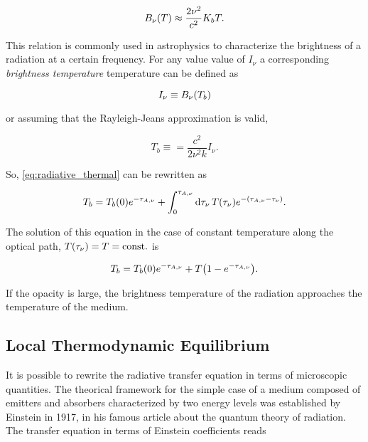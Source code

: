 \begin{equation}
        B_\nu\qty(T) \approx \frac{2\nu^2}{c^2} K_b T.
\end{equation}

This relation is commonly used in astrophysics to characterize the
brightness of a radiation at a certain frequency. For any value value of
$I_\nu$ a corresponding \emph{brightness temperature} temperature can be
defined as

\begin{equation}
        I_\nu \equiv B_\nu\qty(T_b)
\end{equation}

or assuming that the Rayleigh-Jeans approximation is valid,

\begin{equation}
        T_b \equiv = \frac{c^2}{2\nu^2k} I_\nu.
\end{equation}

So, \autoref{eq:radiative_thermal} can be rewritten as

\begin{equation}
        T_b = T_b\qty(0) e^{-\tau_{A,\nu}} +
        \int^{\tau_{A,\nu}}_0 \dd{\tau_\nu} T\qty(\tau_\nu)
        e^{-\qty(\tau_{A,\nu} - \tau_\nu)}.
\end{equation}

The solution of this equation in the case of constant temperature along the
optical path, $T\qty(\tau_\nu) = T = \text{const.}$ is

\begin{equation}
        T_b = T_b\qty(0) e^{-\tau_{A,\nu}} + T\qty(1 -
        e^{-\tau_{A,\nu}}).
        \label{eq:rte_solution_thermal}
\end{equation}

If the opacity is large, the brightness temperature of the radiation
approaches the temperature of the medium.

\subsection{Local Thermodynamic Equilibrium}

It is possible to rewrite the radiative transfer equation in terms of
microscopic quantities. The theorical framework for the simple case of a
medium composed of emitters and absorbers characterized by two energy
levels was established by Einstein in
1917, in his famous article about the quantum theory of radiation.
The transfer equation in terms of Einstein coefficients reads

